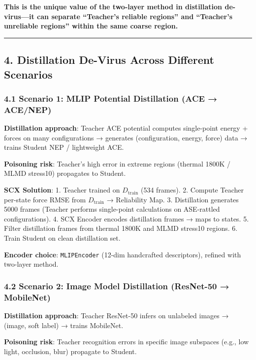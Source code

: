 \documentclass[
  12pt,
]{article}
\begin{document}
\textbf{This is the unique value of the two-layer method in distillation de-virus---it can separate ``Teacher's reliable regions'' and ``Teacher's unreliable regions'' within the same coarse region.}

\begin{center}\rule{0.5\linewidth}{0.5pt}\end{center}

\subsection{4. Distillation De-Virus Across Different Scenarios}\label{distillation-de-virus-scenarios}

\subsubsection{4.1 Scenario 1: MLIP Potential Distillation (ACE → ACE/NEP)}\label{scenario-1-mlip-potential-distillation}

\textbf{Distillation approach}: Teacher ACE potential computes single-point energy + forces on many configurations → generates (configuration, energy, force) data → trains Student NEP / lightweight ACE.

\textbf{Poisoning risk}: Teacher's high error in extreme regions (thermal 1800K / MLMD stress10) propagates to Student.

\textbf{SCX Solution}: 1. Teacher trained on $D_{\text{train}}$ (534 frames). 2. Compute Teacher per-state force RMSE from $D_{\text{train}}$ → Reliability Map. 3. Distillation generates 5000 frames (Teacher performs single-point calculations on ASE-rattled configurations). 4. SCX Encoder encodes distillation frames → maps to states. 5. Filter distillation frames from thermal 1800K and MLMD stress10 regions. 6. Train Student on clean distillation set.

\textbf{Encoder choice}: \texttt{MLIPEncoder} (12-dim handcrafted descriptors), refined with two-layer method.

\subsubsection{4.2 Scenario 2: Image Model Distillation (ResNet-50 → MobileNet)}\label{scenario-2-image-model-distillation}

\textbf{Distillation approach}: Teacher ResNet-50 infers on unlabeled images → (image, soft label) → trains MobileNet.

\textbf{Poisoning risk}: Teacher recognition errors in specific image subspaces (e.g., low light, occlusion, blur) propagate to Student.
\end{document}
